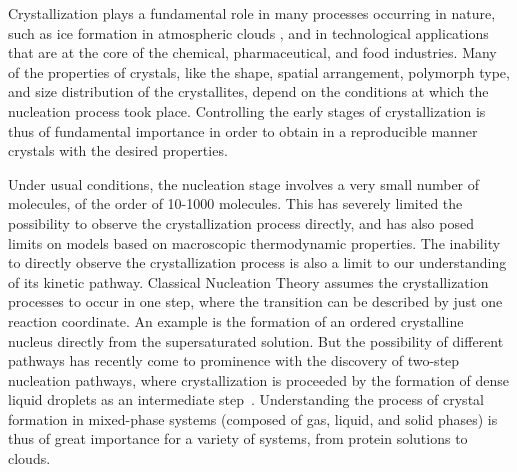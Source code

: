 \documentclass[preprint,amsmath,amssymb,superscriptaddress]{revtex4-1}
\begin{document}
\maketitle


Crystallization plays a fundamental role in many processes occurring in nature, such as ice formation in atmospheric clouds \cite{glickman2000glossary,morrison2012resilience}, and in technological applications
that are at the core of the chemical, pharmaceutical, and food industries.
Many of the properties of crystals, like the shape, spatial arrangement, polymorph type, and size distribution of the crystallites, depend on the conditions at which
the nucleation process took place. Controlling the early stages of crystallization is thus of fundamental importance in order to
obtain in a reproducible manner crystals with the desired properties. 

Under usual conditions, the nucleation stage involves a very small number of molecules, of the order of 10-1000 molecules.
This has severely limited the possibility to observe the crystallization process directly, and has also posed limits on models based on macroscopic thermodynamic properties. 
The inability to directly observe the crystallization process is also a limit to our understanding of its kinetic pathway. 
Classical Nucleation Theory assumes the crystallization processes to occur in one step,
where the transition can be described by just one reaction coordinate. An example is the formation of an ordered crystalline nucleus
directly from the supersaturated solution. But the possibility of different pathways has recently come to prominence with
the discovery of two-step nucleation pathways, where crystallization is proceeded by the formation of dense liquid  droplets as an intermediate step~\cite{ten1997enhancement,SearR,savage2009experimental,vekilov2010two,palberg2014crystallization}.
Understanding the process of crystal formation in mixed-phase systems (composed of gas, liquid, and solid phases) is thus
of great importance for a variety of systems, from protein solutions to clouds. 
\end{document}
